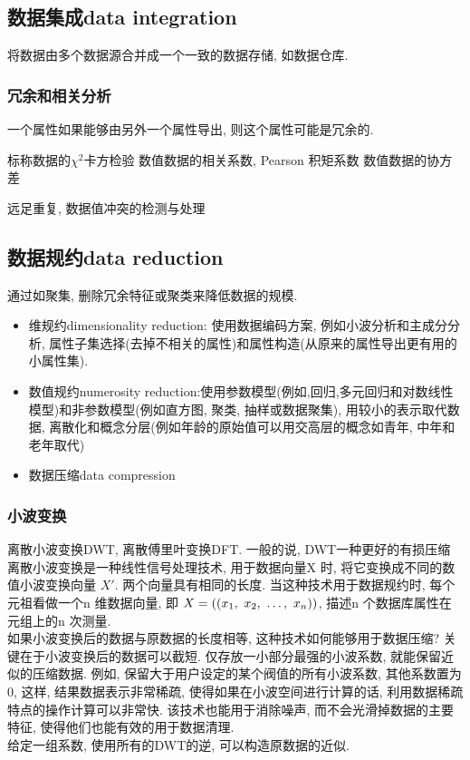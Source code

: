 \documentclass{article}
\begin{document}
\subsection{数据集成data integration}
将数据由多个数据源合并成一个一致的数据存储, 如数据仓库.
\subsubsection{冗余和相关分析}
一个属性如果能够由另外一个属性导出, 则这个属性可能是冗余的.

标称数据的$\chi^2$卡方检验
数值数据的相关系数, Pearson 积矩系数
数值数据的协方差

远足重复, 数据值冲突的检测与处理

\subsection{数据规约data reduction}
通过如聚集, 删除冗余特征或聚类来降低数据的规模.
\begin{itemize}
	\item 维规约dimensionality reduction: 使用数据编码方案, 例如小波分析和主成分分析, 属性子集选择(去掉不相关的属性)和属性构造(从原来的属性导出更有用的小属性集).
	\item 数值规约numerosity reduction:使用参数模型(例如,回归,多元回归和对数线性模型)和非参数模型(例如直方图, 聚类, 抽样或数据聚集), 用较小的表示取代数据, 离散化和概念分层(例如年龄的原始值可以用交高层的概念如青年, 中年和老年取代)
	\item 数据压缩data compression
\end{itemize}
\subsubsection{小波变换}
离散小波变换DWT, 离散傅里叶变换DFT. 一般的说, DWT一种更好的有损压缩
离散小波变换是一种线性信号处理技术, 用于数据向量X 时, 将它变换成不同的数值小波变换向量 $X'$. 两个向量具有相同的长度. 当这种技术用于数据规约时, 每个元祖看做一个n 维数据向量, 即 $X = ((x_1,~x_2,~\ldots,~x_n))$, 描述n 个数据库属性在元组上的n 次测量.\\
如果小波变换后的数据与原数据的长度相等, 这种技术如何能够用于数据压缩? 关键在于小波变换后的数据可以截短. 仅存放一小部分最强的小波系数, 就能保留近似的压缩数据. 
例如, 保留大于用户设定的某个阀值的所有小波系数, 其他系数置为0, 这样, 结果数据表示非常稀疏, 使得如果在小波空间进行计算的话, 利用数据稀疏特点的操作计算可以非常快.
该技术也能用于消除噪声, 而不会光滑掉数据的主要特征, 使得他们也能有效的用于数据清理.\\
给定一组系数, 使用所有的DWT的逆, 可以构造原数据的近似.
\end{document}
